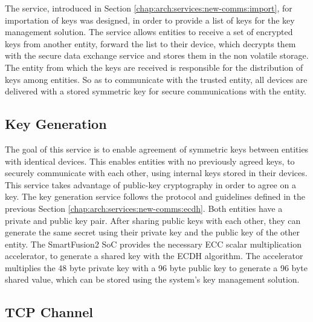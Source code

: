The service, introduced in Section \ref{chap:arch:services:new-comms:import}, for importation of keys was designed, in order to provide a list of keys for the key management solution.
The service allows entities to receive a set of encrypted keys from another entity, forward the list to their device, which decrypts them with the secure data exchange service and stores them in the non volatile storage.
The entity from which the keys are received is responsible for the distribution of keys among entities. So as to communicate with the trusted entity, all devices are delivered with a stored symmetric key for secure communications with the entity.

\subsection{Key Generation}\label{chap:implementation:services:key-generation}

The goal of this service is to enable agreement of symmetric keys between entities with identical devices. This enables entities with no previously agreed keys, to securely communicate with each other, using internal keys stored in their devices.
This service takes advantage of public-key cryptography in order to agree on a key.
The key generation service follows the protocol and guidelines defined in the previous Section \ref{chap:arch:services:new-comms:ecdh}.
Both entities have a private and public key pair. After sharing public keys with each other, they can generate the same secret using their private key and the public key of the other entity.
The SmartFusion2 SoC provides the necessary ECC scalar multiplication accelerator, to generate a shared key with the ECDH algorithm. The accelerator multiplies the 48 byte private key with a 96 byte public key to generate a 96 byte shared value, which can be stored using the system's key management solution.

\subsection{TCP Channel}\label{chap:implementation:services:secure:tcp}

